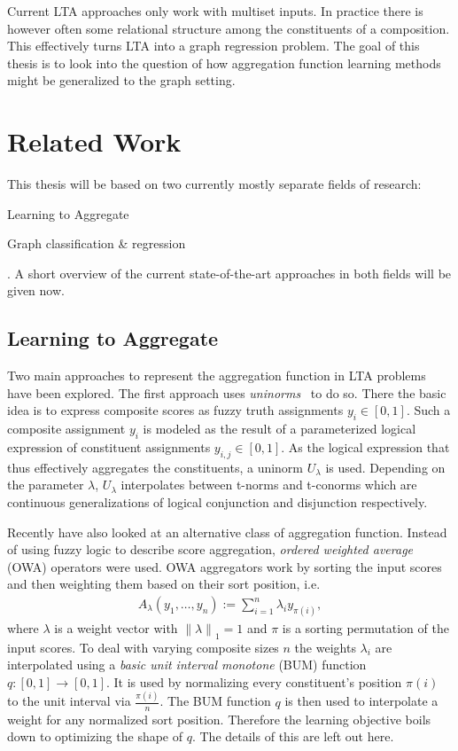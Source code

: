 \documentclass[12pt]{scrartcl}
\begin{document}
Current LTA approaches only work with multiset inputs.
In practice there is however often some relational structure among the constituents of a composition.
This effectively turns LTA into a graph regression problem.
The goal of this thesis is to look into the question of how aggregation function learning methods might be generalized to the graph setting.

\section{Related Work}%
\label{sec:related-work}

This thesis will be based on two currently mostly separate fields of research:
\begin{enumerate*}[label=\textbf{\arabic*.}]
	\item Learning to Aggregate
	\item Graph classification \& regression
\end{enumerate*}.
A short overview of the current state-of-the-art approaches in both fields will be given now.

\subsection{Learning to Aggregate}%
\label{sec:related-work:lta}

Two main approaches to represent the aggregation function in LTA problems have been explored.
The first approach uses \textit{uninorms}~\cite{Melnikov2016} to do so.
There the basic idea is to express composite scores as fuzzy truth assignments $y_i \in [0, 1]$.
Such a composite assignment $y_i$ is modeled as the result of a parameterized logical expression of constituent assignments $y_{i,j} \in [0, 1]$.
As the logical expression that thus effectively aggregates the constituents, a uninorm $U_{\lambda}$ is used.
Depending on the parameter $\lambda$, $U_{\lambda}$ interpolates between t-norms and t-conorms which are continuous generalizations of logical conjunction and disjunction respectively.

Recently \citet{Melnikov2019} have also looked at an alternative class of aggregation function.
Instead of using fuzzy logic to describe score aggregation, \textit{ordered weighted average} (OWA) operators were used.
OWA aggregators work by sorting the input scores and then weighting them based on their sort position, i.e.\ %
\begin{align*}
	A_{\lambda}(y_1, \dots, y_n) := \sum_{i = 1}^n \lambda_i y_{\pi(i)},
\end{align*}
where $\lambda$ is a weight vector with ${\|\lambda\|}_1 = 1$ and $\pi$ is a sorting permutation of the input scores. %
To deal with varying composite sizes $n$ the weights $\lambda_i$ are interpolated using a \textit{basic unit interval monotone} (BUM) function $q: [0, 1] \to [0, 1]$.
It is used by normalizing every constituent's position $\pi(i)$ to the unit interval via $\frac{\pi(i)}{n}$.
The BUM function $q$ is then used to interpolate a weight for any normalized sort position.
Therefore the learning objective boils down to optimizing the shape of $q$.
The details of this are left out here.
\end{document}

